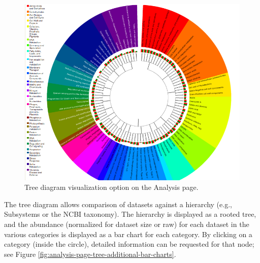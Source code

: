 \documentclass[12pt,fullpage]{report}
\begin{document}
\begin{figure}
\begin{center}
\includegraphics[width=6in]{Images/analysis-page-radial-tree.png}
\end{center}
\caption{
Tree diagram visualization option on the Analysis page.
}
\label{fig:analysis-page-radial-tree}
\end{figure}

The tree diagram allows comparison of datasets against a hierarchy (e.g., \gls{Subsystem}s or the NCBI taxonomy).
The hierarchy is displayed as a rooted tree, and the abundance (normalized for dataset size or raw) for each dataset in the various categories is displayed as a bar chart for each category.
By clicking on a category (inside the circle), detailed information can be requested for that node; see Figure \ref{fig:analysis-page-tree-additional-bar-charts}.
\end{document}

